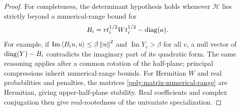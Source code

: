 \begin{proof}
For completeness, the determinant hypothesis holds whenever
$\mathcal H$ lies strictly beyond a numerical-range bound for
\begin{equation}\label{poly:matrix-numerical-range}
 B_i=r t_i^{1/2}Wt_i^{1/2}-\operatorname{diag}(a).
\end{equation}
For example, if $\operatorname{Im}\left\langle B_i u,u\right\rangle\leq\beta\left\lVert u\right\rVert^2$
and $\operatorname{Im}Y_v>\beta$ for all $v$, a null vector of
$\operatorname{diag}(Y)-B_i$ contradicts the imaginary part of its quadratic form.
The same reasoning applies after a common rotation of the half-plane;
principal compressions inherit numerical-range bounds. For Hermitian
$W$ and real probabilities and penalties, the matrices
\eqref{poly:matrix-numerical-range} are
Hermitian, giving upper-half-plane stability. Real coefficients and
complex conjugation then give real-rootedness of the univariate
specialization.
\end{proof}

